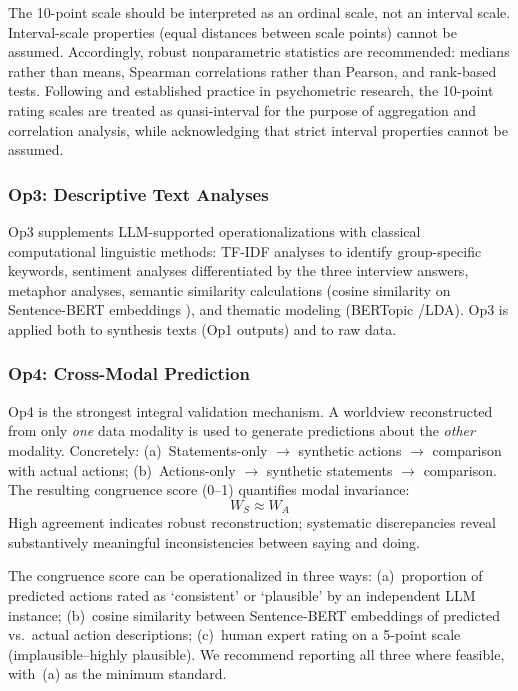 \documentclass[11pt,a4paper]{article}
\theoremstyle{definition}
\theoremstyle{plain}
\theoremstyle{remark}
\begin{document}
The 10-point scale should be interpreted as an ordinal scale, not an interval scale. Interval-scale properties (equal distances between scale points) cannot be assumed. Accordingly, robust nonparametric statistics are recommended: medians rather than means, Spearman correlations rather than Pearson, and rank-based tests. Following \citet{Norman2010} and established practice in psychometric research, the 10-point rating scales are treated as quasi-interval for the purpose of aggregation and correlation analysis, while acknowledging that strict interval properties cannot be assumed.

\subsubsection{Op3: Descriptive Text Analyses}

Op3 supplements LLM-supported operationalizations with classical computational linguistic methods: TF-IDF analyses to identify group-specific keywords, sentiment analyses differentiated by the three interview answers, metaphor analyses, semantic similarity calculations (cosine similarity on Sentence-BERT embeddings \citealp{Reimers2019}), and thematic modeling (BERTopic \citealp{Grootendorst2022}/LDA). Op3 is applied both to synthesis texts (Op1 outputs) and to raw data.

\subsubsection{Op4: Cross-Modal Prediction}

Op4 is the strongest integral validation mechanism. A worldview reconstructed from only \emph{one} data modality is used to generate predictions about the \emph{other} modality. Concretely: (a)~Statements-only $\rightarrow$ synthetic actions $\rightarrow$ comparison with actual actions; (b)~Actions-only $\rightarrow$ synthetic statements $\rightarrow$ comparison. The resulting congruence score (0--1) quantifies modal invariance:
\begin{equation}
  W_S \approx W_A
\end{equation}
High agreement indicates robust reconstruction; systematic discrepancies reveal substantively meaningful inconsistencies between saying and doing.

The congruence score can be operationalized in three ways: (a)~proportion of predicted actions rated as `consistent' or `plausible' by an independent LLM instance; (b)~cosine similarity between Sentence-BERT embeddings of predicted vs.\ actual action descriptions; (c)~human expert rating on a 5-point scale (implausible--highly plausible). We recommend reporting all three where feasible, with~(a) as the minimum standard.
\end{document}
